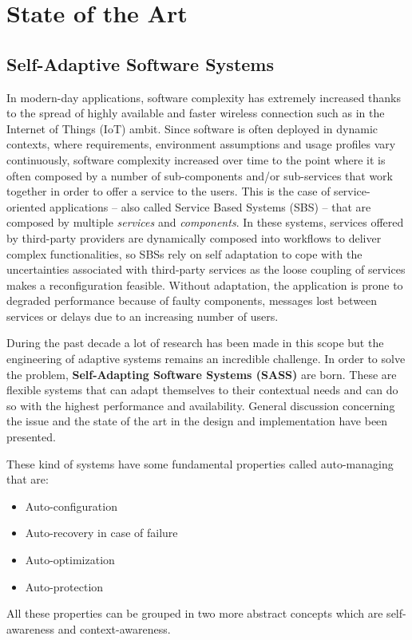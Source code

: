\chapter{State of the Art}
\label{cap:state-of-the-art}

\section{Self-Adaptive Software Systems}
\label{sec:sas}
In modern-day applications, software complexity has extremely increased thanks to the spread of highly available and faster wireless connection such as in the Internet of Things (IoT) ambit. Since software is often deployed in dynamic contexts, where requirements, environment assumptions and usage profiles vary continuously, software complexity increased over time to the point where it is often composed by a number of sub-components and/or sub-services that work together in order to offer a service to the users. This is the case of service-oriented applications -- also called Service Based Systems (SBS) -- that are composed by multiple \emph{services} and \emph{components}. In these systems, services offered by third-party providers are dynamically composed into workflows to deliver complex functionalities, so SBSs rely on self adaptation to cope with the uncertainties associated with third-party services as the loose coupling of services makes a reconfiguration feasible. Without adaptation, the application is prone to degraded performance  because of faulty components, messages lost between services or delays due to an increasing number of users.

During the past decade a lot of research has been made in this scope but the engineering of adaptive systems remains an incredible challenge\cite{soft-eng-for-sas-2}. In order to solve the problem, \textbf{Self-Adapting Software Systems (SASS)} are born. These are flexible systems that can adapt themselves to their contextual needs and can do so with the highest performance and availability. General discussion concerning the issue and the state of the art in the design and implementation have been presented\cite{soft-eng-for-sas-2}\cite{survey-aut-comp}\cite{self-adap-soft}\cite{soft-eng-for-sas-1}\cite{soft-eng-for-sas-3}\cite{arch-based-appr-to-sas}\cite{sas-quant-ver}.

These kind of systems have some fundamental properties called auto-managing that are:
\begin{itemize}
	\item Auto-configuration
	\item Auto-recovery in case of failure
	\item Auto-optimization
	\item Auto-protection
\end{itemize}
All these properties can be grouped in two more abstract concepts which are self-awareness and context-awareness.

